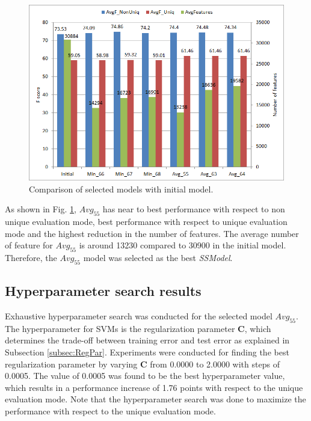 \begin{figure}
\centering
\includegraphics[scale=0.6]{figures/6ModelsComparison.png}
\caption{Comparison of selected models with initial model.}\label{fig:6ModelsComp}
\end{figure}

As shown in Fig. \ref{fig:6ModelsComp}, $Avg_{55}$ has near to best performance with respect to non unique evaluation mode, best performance with respect to unique evaluation mode and the highest reduction in the number of features. The average number of feature for $Avg_{55}$ is around 13230 compared to 30900 in the initial model. Therefore, the $Avg_{55}$ model was selected as the best \textit{SSModel}.


\subsection{Hyperparameter search results}

Exhaustive hyperparameter search was conducted for the selected model $Avg_{55}$. The hyperparameter for SVMs is the regularization parameter $\mathbf{C}$, which determines the trade-off between training error and test error as explained in Subsection \ref{subsec:RegPar}. Experiments were conducted for finding the best regularization parameter by varying $\mathbf{C}$ from 0.0000 to 2.0000 with steps of 0.0005. The value of 0.0005 was found to be the best hyperparameter value, which results in a performance increase of 1.76 points with respect to the unique evaluation mode. Note that the hyperparameter search was done to maximize the performance with respect to the unique evaluation mode.

